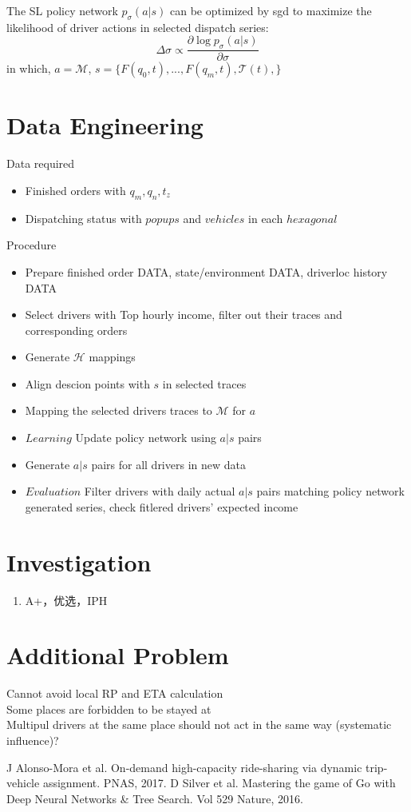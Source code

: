 \documentclass{article}
\begin{document}
\noindent
The SL policy network $p_{\sigma}(a|s)$ can be optimized by sgd to maximize the likelihood of driver actions in selected dispatch series:
\begin{equation}
    \label{reward}
    \Delta \sigma \propto \frac{\partial \log p_\sigma (a|s)}{\partial \sigma}
\end{equation}
in which, $a=\mathcal{M}$, $s=\{F(q_0,t),...,F(q_m,t),\mathcal{T}(t),\}$

\section{Data Engineering}
Data required
\begin{itemize}
    \item Finished orders with $q_m,q_n,t_z$
    \item Dispatching status with $popups$ and $vehicles$ in each $hexagonal$
\end{itemize}

\noindent
Procedure
\begin{itemize}
    \item Prepare finished order DATA, state/environment DATA, driverloc history DATA
    \item Select drivers with Top hourly income, filter out their traces and corresponding orders
    \item Generate $\mathcal{H}$ mappings
    \item Align descion points with $s$ in selected traces
    \item Mapping the selected drivers traces to $\mathcal{M}$ for $a$
    \item $Learning$ Update policy network using $a|s$ pairs
    \item Generate $a|s$ pairs for all drivers in new data
    \item $Evaluation$ Filter drivers with daily actual $a|s$ pairs matching policy network generated series, check fitlered drivers' expected income
\end{itemize}


\section{Investigation}
\begin{enumerate}
    \item A+，优选，IPH
\end{enumerate}


\section{Additional Problem}
Cannot avoid local RP and ETA calculation\\
Some places are forbidden to be stayed at\\
Multipul drivers at the same place should not act in the same way (systematic influence)?\\


\begin{thebibliography}{1}

   J Alonso-Mora et al. On-demand high-capacity ride-sharing via dynamic trip-vehicle assignment. PNAS, 2017.
   D Silver et al. Mastering the game of Go with Deep Neural Networks \& Tree Search. Vol 529 Nature, 2016.

\end{thebibliography}
\end{document}
